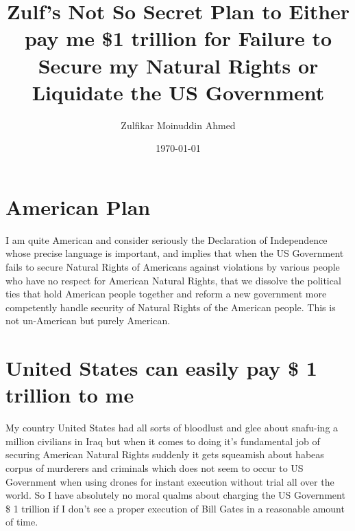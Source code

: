\documentclass{amsart}
\title{Zulf's Not So Secret Plan to Either pay me \$1 trillion for Failure to Secure my Natural Rights or Liquidate the US Government}
\author{Zulfikar Moinuddin Ahmed}
\date{\today}
\begin{document}
\maketitle
\section{American Plan}
I am quite American and consider seriously the Declaration of Independence whose precise language is important, and implies that when the US Government fails to secure Natural Rights of Americans against violations by various people who have no respect for American Natural Rights, that we dissolve the political ties that hold American people together and reform a new government more competently handle security of Natural Rights of the American people.  This is not un-American but purely American. 

\section{United States can easily pay \$ 1 trillion to me}

My country United States had all sorts of bloodlust and glee about snafu-ing a million civilians in Iraq but when it comes to doing it's fundamental job of securing American Natural Rights suddenly it gets squeamish about habeas corpus of murderers and criminals which does not seem to occur to US Government when using drones for instant execution without trial all over the world.  So I have absolutely no moral qualms about charging the US Government \$ 1 trillion if I don't see a proper execution of Bill Gates in a reasonable amount of time.
\end{document}
